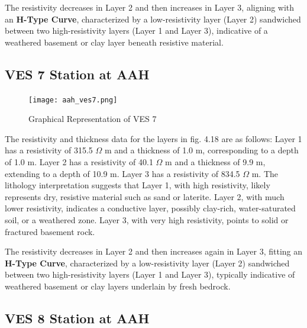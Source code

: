 \documentclass[12pt,a4paper]{report}
\begin{document}
The resistivity decreases in Layer 2 and then increases in Layer 3, aligning with an \textbf{H-Type Curve}, characterized by a low-resistivity layer (Layer 2) sandwiched between two high-resistivity layers (Layer 1 and Layer 3), indicative of a weathered basement or clay layer beneath resistive material.

\subsection{VES 7 Station at AAH}

\begin{figure}[H]
    \centering
    \texttt{[image: aah\_ves7.png]}
    \caption{Graphical Representation of VES 7}
    \label{fig:AAH_VES_7_Curve}
\end{figure}
The resistivity and thickness data for the layers in fig. 4.18 are as follows: Layer 1 has a resistivity of 315.5 $\Omega$ m and a thickness of 1.0 m, corresponding to a depth of 1.0 m. Layer 2 has a resistivity of 40.1 $\Omega$ m and a thickness of 9.9 m, extending to a depth of 10.9 m. Layer 3 has a resistivity of 834.5 $\Omega$ m. The lithology interpretation suggests that Layer 1, with high resistivity, likely represents dry, resistive material such as sand or laterite. Layer 2, with much lower resistivity, indicates a conductive layer, possibly clay-rich, water-saturated soil, or a weathered zone. Layer 3, with very high resistivity, points to solid or fractured basement rock.

The resistivity decreases in Layer 2 and then increases again in Layer 3, fitting an \textbf{H-Type Curve}, characterized by a low-resistivity layer (Layer 2) sandwiched between two high-resistivity layers (Layer 1 and Layer 3), typically indicative of weathered basement or clay layers underlain by fresh bedrock.

\subsection{VES 8 Station at AAH}
\end{document}
